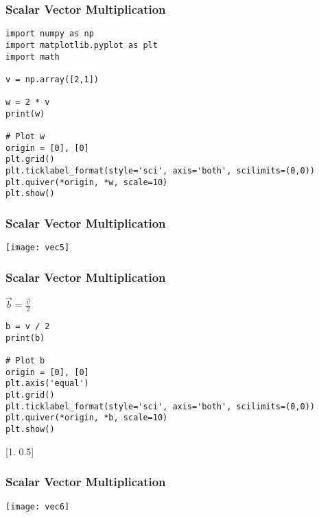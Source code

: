  \begin{frame}[fragile] \frametitle{Scalar Vector Multiplication}

 \begin{lstlisting}
import numpy as np
import matplotlib.pyplot as plt
import math

v = np.array([2,1])

w = 2 * v
print(w)

# Plot w
origin = [0], [0]
plt.grid()
plt.ticklabel_format(style='sci', axis='both', scilimits=(0,0))
plt.quiver(*origin, *w, scale=10)
plt.show()
 \end{lstlisting}
 

 
\end{frame}

 \begin{frame}[fragile] \frametitle{Scalar Vector Multiplication}


\begin{center}
\texttt{[image: vec5]}
\end{center}

 
\end{frame}

 \begin{frame}[fragile] \frametitle{Scalar Vector Multiplication}

 $\vec{b} = \frac{\vec{v}}{2}$
 
 \begin{lstlisting}
b = v / 2
print(b)

# Plot b
origin = [0], [0]
plt.axis('equal')
plt.grid()
plt.ticklabel_format(style='sci', axis='both', scilimits=(0,0))
plt.quiver(*origin, *b, scale=10)
plt.show()
 \end{lstlisting}
 
[1.  0.5]
 
\end{frame}

 \begin{frame}[fragile] \frametitle{Scalar Vector Multiplication}


\begin{center}
\texttt{[image: vec6]}
\end{center}

 
\end{frame}



